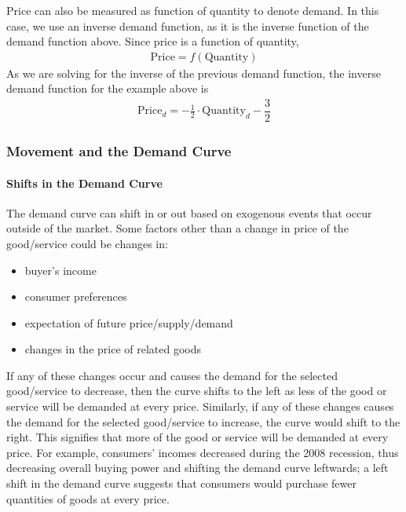 \documentclass[letterpaper,10pt,english]{jupyterBook}
\begin{document}
\sphinxAtStartPar
Price can also be measured as function of quantity to denote demand. In this case, we use an inverse demand function, as it is the inverse function of the demand function above. Since price is a function of quantity,
\begin{equation*}
\begin{split}\text{Price} = f(\text{Quantity})\end{split}
\end{equation*}
\sphinxAtStartPar
As we are solving for the inverse of the previous demand function, the inverse demand function for the example above is
\begin{equation*}
\begin{split}\text{Price}_{d}=-\frac{1}{2} \cdot \text{Quantity}_{d} - \dfrac{3}{2}\end{split}
\end{equation*}

\subsubsection{Movement and the Demand Curve}
\label{\detokenize{content/01-demand/01-demand:movement-and-the-demand-curve}}

\paragraph{Shifts in the Demand Curve}
\label{\detokenize{content/01-demand/01-demand:shifts-in-the-demand-curve}}
\sphinxAtStartPar
The demand curve can shift in or out based on exogenous events that occur outside of the market.
Some factors other than a change in price of the good/service could be changes in:
\begin{itemize}
\item {} 
\sphinxAtStartPar
buyer’s income

\item {} 
\sphinxAtStartPar
consumer preferences

\item {} 
\sphinxAtStartPar
expectation of future price/supply/demand

\item {} 
\sphinxAtStartPar
changes in the price of related goods

\end{itemize}

\sphinxAtStartPar
If any of these changes occur and causes the demand for the selected good/service to decrease, then the curve shifts to the left as less of the good or service will be demanded at every price. Similarly, if any of these changes causes the demand for the selected good/service to increase, the curve would shift to the right. This signifies that more of the good or service will be demanded at every price. For example, consumers’ incomes decreased during the 2008 recession, thus decreasing overall buying power and shifting the demand curve leftwards; a left shift in the demand curve suggests that consumers would purchase fewer quantities of goods at every price.
\end{document}
